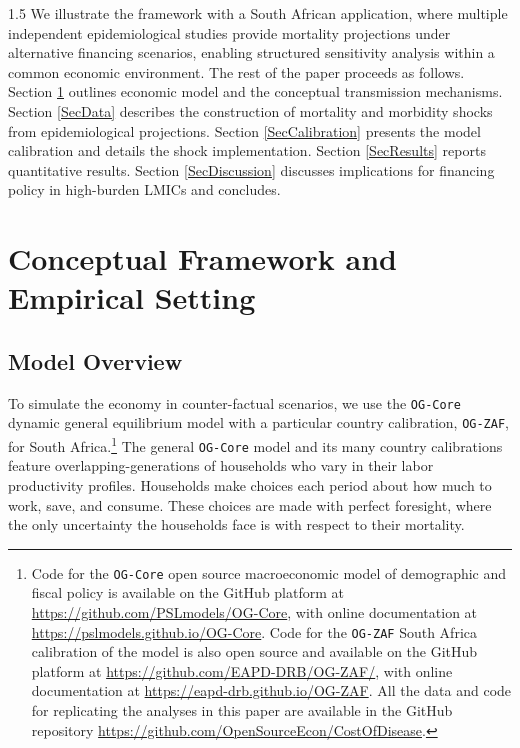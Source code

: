 \documentclass[letterpaper,12pt]{article}
\theoremstyle{definition}
\begin{document}
\begin{spacing}{1.5}
We illustrate the framework with a South African application, where multiple independent epidemiological studies provide mortality projections under alternative financing scenarios, enabling structured sensitivity analysis within a common economic environment. The rest of the paper proceeds as follows. Section \ref{SecFramework} outlines economic model and the conceptual transmission mechanisms. Section \ref{SecData} describes the construction of mortality and morbidity shocks from epidemiological projections. Section \ref{SecCalibration} presents the model calibration and details the shock implementation. Section \ref{SecResults} reports quantitative results. Section \ref{SecDiscussion} discusses implications for financing policy in high-burden LMICs and concludes.

\section{Conceptual Framework and Empirical Setting}\label{SecFramework}


  \subsection{Model Overview}\label{SecModelOverview}

  To simulate the economy in counter-factual scenarios, we use the \texttt{OG-Core} dynamic general equilibrium model with a particular country calibration, \texttt{OG-ZAF}, for South Africa.\footnote{Code for the \texttt{OG-Core} open source macroeconomic model of demographic and fiscal policy is available on the GitHub platform at \href{https://github.com/PSLmodels/OG-Core}{https://github.com/PSLmodels/OG-Core}, with online documentation at \href{https://pslmodels.github.io/OG-Core}{https://pslmodels.github.io/OG-Core}. Code for the \texttt{OG-ZAF} South Africa calibration of the model is also open source and available on the GitHub platform at \href{https://github.com/EAPD-DRB/OG-ZAF/}{https://github.com/EAPD-DRB/OG-ZAF/}, with online documentation at \href{https://eapd-drb.github.io/OG-ZAF}{https://eapd-drb.github.io/OG-ZAF}. All the data and code for replicating the analyses in this paper are available in the GitHub repository \href{https://github.com/OpenSourceEcon/CostOfDisease}{https://github.com/OpenSourceEcon/CostOfDisease}.} The general \texttt{OG-Core} model and its many country calibrations feature overlapping-generations of households who vary in their labor productivity profiles. Households make choices each period about how much to work, save, and consume. These choices are made with perfect foresight, where the only uncertainty the households face is with respect to their mortality.


\end{spacing}
\end{document}
